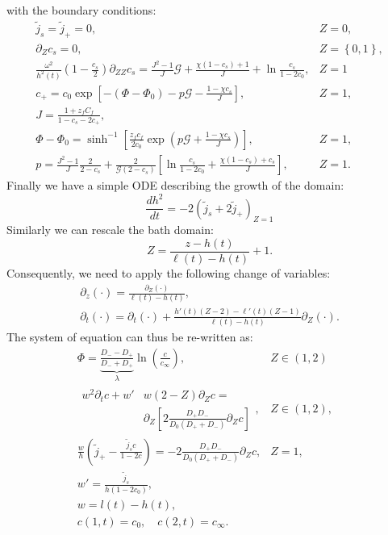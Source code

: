 \documentclass[12pt]{extarticle}
\begin{document}
with the boundary conditions:
\begin{eqnarray}
\tilde{j}_s=\tilde{j}_+=0,&  Z=0,\\
\partial_Z c_s =0, & Z=\left\{0,1\right\},\\
\scriptstyle
\frac{\omega^2}{h^2(t)}\left(1-\frac{c_s}{2}\right)\partial_{ZZ}c_s=\frac{J^2-1}{J}\mathcal{G}+\frac{\chi(1-c_s)+1}{J}+ \ln \frac{c_s}{1-2c_0},& Z=1\\
c_+ = c_0 \exp \left[-\left(\Phi-\Phi_0\right)-p\mathcal{G}-\frac{1-\chi c_s}{J}\right], & Z=1,\\
J= \frac{1+z_fC_f}{1-c_s-2c_+}, \\
\Phi-\Phi_0= \sinh^{-1} \left[\frac{z_fc_f}{2c_0}\exp\left(p\mathcal{G}+\frac{1-\chi c_s}{J}\right)\right], & Z=1,\\
\scriptstyle
p=\frac{J^2-1}{J}\frac{2}{2-c_s}+\frac{2}{\mathcal{G}(2-c_s)} \left[\ln\frac{c_s}{1-2c_0}+\frac{\chi(1-c_s)+c_s}{J}\right],& Z=1.
\end{eqnarray}
Finally we have a simple ODE describing the growth of the domain:
\begin{equation}
\frac{d h^2}{dt} = - 2\left(\tilde{j}_s+2\tilde{j}_+\right)_{Z=1}
\end{equation}
Similarly we can rescale the bath domain:
\begin{equation}
Z= \frac{z-h(t)}{\ell(t)-h(t)}+1.
\end{equation}
Consequently, we need to apply the following change of variables:
\begin{eqnarray}
\partial_z(\cdot) = \frac{\partial_Z (\cdot)}{\ell(t)-h(t)},\\
\partial_t(\cdot) = \partial_t (\cdot) + \frac{h'(t)(Z-2)-\ell'(t)(Z-1)}{\ell(t)-h(t)}\partial_Z(\cdot).
\end{eqnarray}
The system of equation can thus be re-written as:
\begin{eqnarray}
\Phi = \underbrace{\frac{D_--D_+}{D_-+D_+}}_{\lambda} \ln\left(\frac{c}{c_\infty}\right), &Z\in\left(1,2\right)&\\[2mm]
\begin{aligned}
w^2\partial_t c + w'& w(2-Z)\partial_Z c=\\ &\partial_Z\left[2\frac{D_+D_-}{D_0(D_++D_-)}  \partial_Z c\right]
\end{aligned}, &Z\in\left(1,2\right),&\\
\frac{w}{h}\left(\tilde{j}_+-\frac{\tilde{j}_sc}{1-2c}\right) =- 2 \frac{D_+D_-}{D_0(D_++D_-)}\partial_Z c, & Z=1,&\\
w'=\frac{\tilde{j}_s}{h(1-2c_0)},\\
w=l(t)-h(t),\\
c(1,t)=c_0, \quad c(2,t)=c_\infty.
\end{eqnarray}

%
\end{document}
